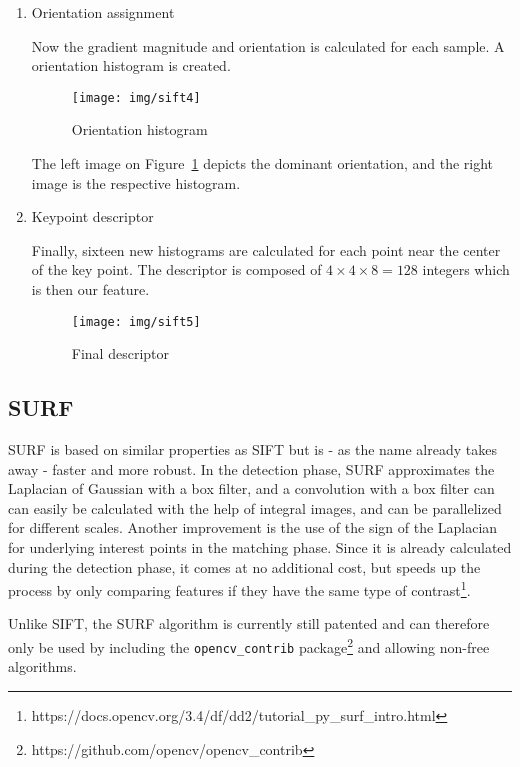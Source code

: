 \documentclass{scrartcl}
\begin{document}
\begin{enumerate}
    \item Orientation assignment

        Now the gradient magnitude and orientation is calculated for each sample. A orientation histogram is created.

        \begin{figure}[H]
            \centering
            \texttt{[image: img/sift4]}
            \caption{Orientation histogram}%
            \label{fig:sift4}
        \end{figure}

        The left image on Figure~\ref{fig:sift4} depicts the dominant orientation, and the right image is the respective histogram.

    \item Keypoint descriptor

        Finally, sixteen new histograms are calculated for each point near the center of the key point. The descriptor is composed of $4 \times 4 \times 8=128$ integers which is then our feature.

        \begin{figure}[H]
            \centering
            \texttt{[image: img/sift5]}
            \caption{Final descriptor}%
            \label{fig:sift5}
        \end{figure}
\end{enumerate}


\subsection{SURF}
SURF is based on similar properties as SIFT but is - as the name already takes away - faster and more robust. In the detection phase, SURF approximates the Laplacian of Gaussian with a box filter, and a convolution with a box filter can can easily be calculated with the help of integral images, and can be parallelized for different scales.
Another improvement is the use of the sign of the Laplacian for underlying interest points in the matching phase. Since it is already calculated during the detection phase, it comes at no additional cost, but speeds up the process by only comparing features if they have the same type of contrast\footnote{https://docs.opencv.org/3.4/df/dd2/tutorial\_py\_surf\_intro.html}.

Unlike SIFT, the SURF algorithm is currently still patented and can therefore only be used by including the \texttt{opencv\_contrib} package\footnote{https://github.com/opencv/opencv\_contrib} and allowing non-free algorithms.
\end{document}
